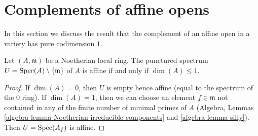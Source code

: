 \section{Complements of affine opens}
\label{section-complement-affine-open}

\noindent
In this section we discuss the result that the complement of an
affine open in a variety has pure codimension $1$.

\begin{lemma}
\label{lemma-affine-punctured-spec}
Let $(A, \mathfrak m)$ be a Noetherian local ring.
The punctured spectrum $U = \mathop{\mathrm{Spec}}(A) \setminus \{\mathfrak m\}$
of $A$ is affine if and only if $\dim(A) \leq 1$.
\end{lemma}

\begin{proof}
If $\dim(A) = 0$, then $U$ is empty hence affine (equal to the spectrum of
the $0$ ring). If $\dim(A) = 1$, then we can choose an element
$f \in \mathfrak m$ not contained in any of the finite number of minimal
primes of $A$
(Algebra, Lemmas \ref{algebra-lemma-Noetherian-irreducible-components} and
\ref{algebra-lemma-silly}). Then $U = \mathop{\mathrm{Spec}}(A_f)$
is affine.


\end{proof}
